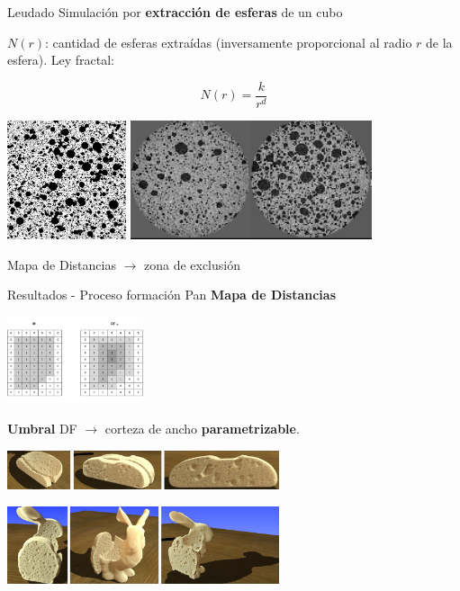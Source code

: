 \documentclass[spanish,unknownkeysallowed,10pt]{beamer}
\begin{document}
\begin{frame}{Leudado}
Simulación por \textbf{extracción de esferas} de un cubo

$N(r)$: cantidad de esferas extraídas (inversamente proporcional al radio $r$ de la esfera). Ley fractal:

\begin{equation*}
N(r) = \frac{k}{r^{d}}
\end{equation*}

\vspace{0.3cm}
\centering
\includegraphics[height=3.5cm]{../figures/bubbles}
\includegraphics[height=3.5cm]{../figures/proving}

Mapa de Distancias $\rightarrow$ zona de exclusión
\end{frame}

\begin{frame}{Resultados - Proceso formación Pan}
\textbf{Mapa de Distancias}
\centerline{\includegraphics[width=4cm]{../figures/DistanceTransform}}

\textbf{Umbral} DF $\rightarrow$ corteza de ancho \textbf{parametrizable}.

\vspace{0.3cm}

\centerline{\includegraphics[width=8cm]{../figures/prebakebread}}

\centerline{\includegraphics[width=8cm]{../figures/prebakebunny}}
\end{frame}
\end{document}
